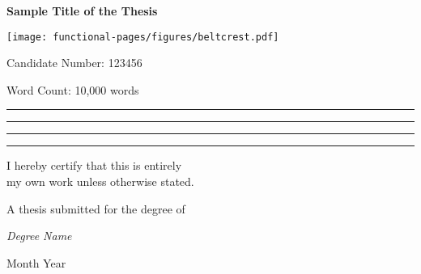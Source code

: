 \begin{titlepage}
    \null
    \renewcommand{\footnotesize}{\small}
    \renewcommand{\footnoterule}{\relax}
    \thispagestyle{empty}
    \begin{center}
    {\LARGE \bfseries Sample Title of the Thesis \par}
    {\large \vspace*{30mm} \texttt{[image: functional-pages/figures/beltcrest.pdf]} \par \vspace*{25mm}} %
    {\Large Candidate Number: 123456 \par}
    {\Large Word Count: 10,000 words \par}
    {\large \vspace*{20mm}
    \rule[-2mm]{1pt}{7mm}\hspace{-1pt}%
    \rule[-2mm]{7mm}{1pt}\hspace{-1pt}%
    \rule[-2mm]{1pt}{7mm}\hspace{-7mm}%
    \rule[5mm]{7mm}{1pt}\hspace{1em}%
        \begin{varwidth}{\textwidth}I hereby certify that this is entirely\\my own work unless otherwise stated.\end{varwidth} \par}
    {\large \vspace*{10mm}
    {A thesis submitted for the degree of \par}
    \vspace*{1ex}
    {\it Degree Name \par}
    \vspace*{2ex}
    {Month Year}}
    \end{center}
    \vfill\null
\end{titlepage}